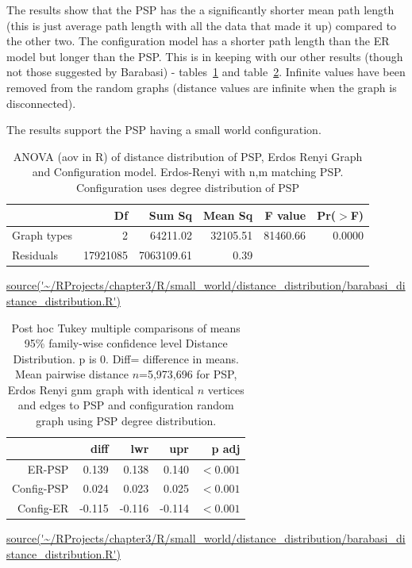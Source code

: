 The results show that the PSP has the a significantly shorter mean path length (this is just average path length with all the data that made it up) compared to the other two. The configuration model has a shorter path length than the ER model but longer than the PSP. This is in keeping with our other results (though not those suggested by Barabasi) - tables~\ref{tab:ANOVA_distance_distribution} and table~\ref{tab:Tukey post hoc}. Infinite values have been removed from the random graphs (distance values are infinite when the graph is disconnected).

The results support the PSP having a small world configuration. 

\begin{table}[ht]
\centering
\begin{tabular}{lrrrrr}
  \toprule
 & Df & Sum Sq & Mean Sq & F value & Pr($>$F) \\ 
  \midrule
Graph types & 2 & 64211.02 & 32105.51 & 81460.66 & 0.0000 \vspace{1mm}\\ 
  Residuals & 17921085 & 7063109.61 & 0.39 &  &  \vspace{1mm}\\ 
   \bottomrule
\end{tabular}
\caption{ANOVA (aov in R) of distance distribution of PSP, Erdos Renyi Graph and Configuration model. Erdos-Renyi with n,m matching PSP. Configuration uses degree distribution of PSP}
\tiny\url{source('~/RProjects/chapter3/R/small_world/distance_distribution/barabasi_distance_distribution.R')}
\label{tab:ANOVA_distance_distribution}
\end{table}
\begin{table}[ht]
\centering
\begin{tabular}{rrrrr}
  \toprule  
 & diff & lwr & upr & p adj \\ 
  \midrule
ER-PSP & 0.139 & 0.138 & 0.140 & $<0.001$ \\ 
  Config-PSP & 0.024 & 0.023 & 0.025 & $<0.001$ \\ 
  Config-ER & -0.115 & -0.116 & -0.114 & $<0.001$ \\ 
   \bottomrule
\end{tabular}
\caption[Tukey Distance Distribution]{Post hoc  Tukey multiple comparisons of means
    95\% family-wise confidence level Distance Distribution. p is 0. Diff= difference in means. Mean pairwise distance $n$=5,973,696 for PSP, Erdos Renyi gnm graph with identical $n$ vertices and edges to PSP and configuration random graph using PSP degree distribution. }
\tiny\url{source('~/RProjects/chapter3/R/small_world/distance_distribution/barabasi_distance_distribution.R')}
\label{tab:Tukey post hoc}
\end{table}



